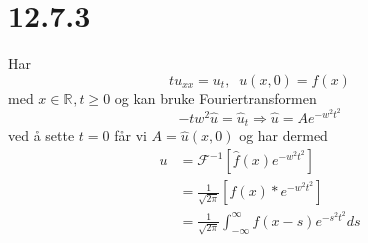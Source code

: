 \documentclass{report}
\newcommand{\M}[2]{\mathbb{#1}^{#2}}
\newcommand{\bbrack}[1]{\left[ #1 \right]}
\newcommand{\ifft}[1]{\mathcal{F}^{-1} \bbrack{ #1 }}
\begin{document}
\section*{12.7.3}
Har
\begin{equation}
  \label{eq:68}
  tu_{xx} = u_{t}, \;\; u(x, 0) = f(x)
\end{equation}
med $x\in\M{R}{}, t \geq 0$ og kan bruke Fouriertransformen
\begin{equation}
  \label{eq:69}
  -tw^{2} \hat{u} = \hat{u}_{t} \Rightarrow \hat{u} = Ae^{-w^{2}t^{2}}
\end{equation}
ved å sette $t=0$ får vi $A = \hat{u}(x, 0)$ og har dermed
\begin{equation}
  \label{eq:70}
  \begin{split}
    u &= \ifft{ \hat{f}(x) e^{-w^{2}t^{2}} } \\
      &= \frac{1}{\sqrt{2\pi}} \bbrack{ f(x) * e^{-w^{2}t^{2}} } \\
      &= \frac{1}{\sqrt{2\pi}} \int_{-\infty}^{\infty} f(x-s) e^{-s^{2}t^{2}} ds \\
  \end{split}
\end{equation}
\end{document}
